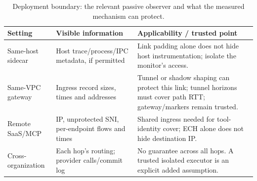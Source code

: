 \begin{table}[t]\centering\footnotesize
\caption{Deployment boundary: the relevant passive observer and what the measured mechanism can protect.}\label{tab:r7-deployment}
\begin{tabularx}{\columnwidth}{@{}p{}YY@{}}\toprule
Setting & Visible information & Applicability / trusted point\\\midrule
Same-host sidecar & Host trace/process/IPC metadata, if permitted & Link padding alone does not hide host instrumentation; isolate the monitor's access.\\
Same-VPC gateway & Ingress record sizes, times and addresses & Tunnel or shadow shaping can protect this link; tunnel horizons must cover path RTT; gateway/markers remain trusted.\\
Remote SaaS/MCP & IP, unprotected SNI, per-endpoint flows and times & Shared ingress needed for tool-identity cover; ECH alone does not hide destination IP.\\
Cross-organization & Each hop's routing; provider calls/commit log & No guarantee across all hops. A trusted isolated executor is an explicit added assumption.\\\bottomrule
\end{tabularx}\end{table}
